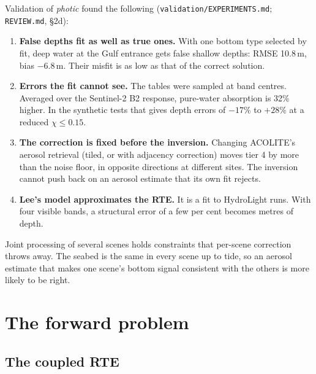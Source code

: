 \documentclass[11pt]{article}
\numberwithin{equation}{section}
\newcommand{\code}[1]{\texttt{#1}}
\begin{document}
Validation of \textit{photic} found the following (\code{validation/EXPERIMENTS.md};
\code{REVIEW.md}, \S2d):
\begin{enumerate}
\item \textbf{False depths fit as well as true ones.} With one bottom type selected by fit, deep
water at the Gulf entrance gets false shallow depths: RMSE 10.8\,m, bias $-6.8$\,m. Their
misfit is as low as that of the correct solution.
\item \textbf{Errors the fit cannot see.} The tables were sampled at band centres. Averaged over
the Sentinel-2 B2 response, pure-water absorption is 32\% higher. In the synthetic tests that
gives depth errors of $-17\%$ to $+28\%$ at a reduced $\chi \le 0.15$.
\item \textbf{The correction is fixed before the inversion.} Changing ACOLITE's aerosol
retrieval (tiled, or with adjacency correction) moves tier 4 by more than the noise floor, in
opposite directions at different sites. The inversion cannot push back on an aerosol estimate
that its own fit rejects.
\item \textbf{Lee's model approximates the RTE.} It is a fit to HydroLight runs. With four
visible bands, a structural error of a few per cent becomes metres of depth.
\end{enumerate}
Joint processing of several scenes holds constraints that per-scene correction throws away.
The seabed is the same in every scene up to tide, so an aerosol estimate that makes one scene's
bottom signal consistent with the others is more likely to be right.

\section{The forward problem}\label{sec:forward}

\subsection{The coupled RTE}
\end{document}
